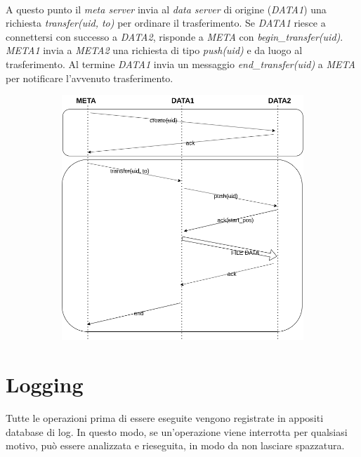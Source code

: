 \documentclass[11pt,a4paper,english]{article}
\begin{document}
\paragraph{} A questo punto il \emph{meta server} invia al \emph{data server} di origine (\emph{DATA1}) una richiesta \emph{transfer(uid, to)} per ordinare il trasferimento. Se \emph{DATA1} riesce a connettersi con successo a \emph{DATA2}, risponde a \emph{META} con \emph{begin\_transfer(uid)}. \emph{META1} invia a \emph{META2} una richiesta di tipo \emph{push(uid)} e da luogo al trasferimento. Al termine \emph{DATA1} invia un messaggio \emph{end\_transfer(uid)} a \emph{META} per notificare l'avvenuto trasferimento.


\begin{figure}[H]
	\centering
	\begin{subfigure}{0.80\linewidth}
		\includegraphics[width=\linewidth]{../diagrams/requests/transfer_request.png}
	\end{subfigure}
\end{figure}



\section{Logging}

\paragraph{} Tutte le operazioni prima di essere eseguite vengono registrate in appositi database di log\cite{logfile}. In questo modo, se un'operazione viene interrotta per qualsiasi motivo, può essere analizzata e rieseguita, in modo da non lasciare spazzatura. 
\end{document}
